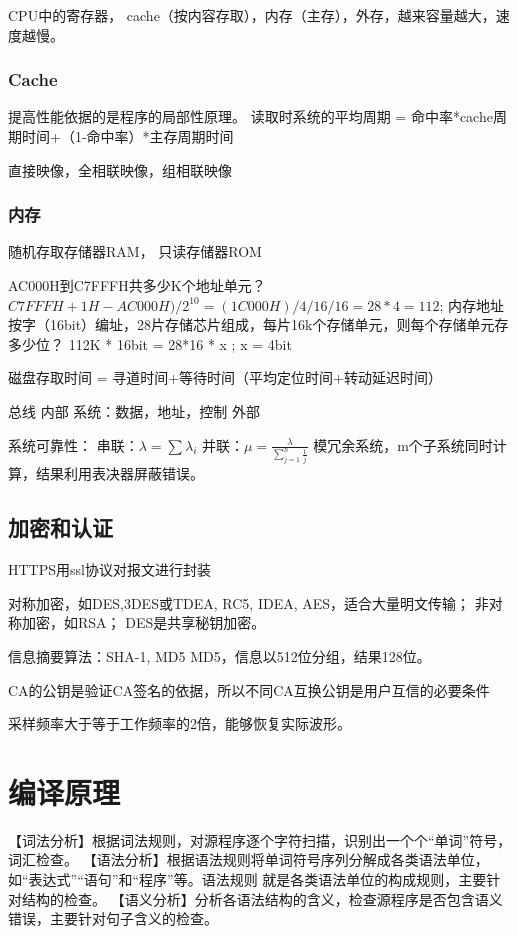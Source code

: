 \documentclass[UTF8]{article}
\begin{document}
CPU中的寄存器， cache（按内容存取），内存（主存），外存，越来容量越大，速度越慢。

\subsubsection{Cache}
提高性能依据的是程序的局部性原理。
读取时系统的平均周期 = 命中率*cache周期时间+（1-命中率）*主存周期时间

直接映像，全相联映像，组相联映像

\subsubsection{内存}
随机存取存储器RAM，
只读存储器ROM

AC000H到C7FFFH共多少K个地址单元？
$C7FFFH + 1H - AC000H ) /2^{10} = (1C000H)/4/16/16 = 28*4 = 112$;
内存地址按字（16bit）编址，28片存储芯片组成，每片16k个存储单元，则每个存储单元存多少位？
112K * 16bit =  28*16 * x ; x = 4bit

磁盘存取时间 = 寻道时间+等待时间（平均定位时间+转动延迟时间）

总线
内部
系统：数据，地址，控制
外部

系统可靠性：
串联：$\lambda  = \sum \lambda_i$
并联：$\mu = \frac{\lambda}{\sum_{j=1}^n{\frac{1}{j}}}$
模冗余系统，m个子系统同时计算，结果利用表决器屏蔽错误。

\subsection{加密和认证}
HTTPS用ssl协议对报文进行封装

对称加密，如DES,3DES或TDEA, RC5, IDEA, AES，适合大量明文传输；
非对称加密，如RSA；
DES是共享秘钥加密。

信息摘要算法：SHA-1, MD5
MD5，信息以512位分组，结果128位。


CA的公钥是验证CA签名的依据，所以不同CA互换公钥是用户互信的必要条件


采样频率大于等于工作频率的2倍，能够恢复实际波形。



\section{编译原理}


【词法分析】根据词法规则，对源程序逐个字符扫描，识别出一个个“单词”符号，词汇检查。
【语法分析】根据语法规则将单词符号序列分解成各类语法单位，如“表达式”“语句”和“程序”等。语法规则
就是各类语法单位的构成规则，主要针对结构的检查。
【语义分析】分析各语法结构的含义，检查源程序是否包含语义错误，主要针对句子含义的检查。
\end{document}
